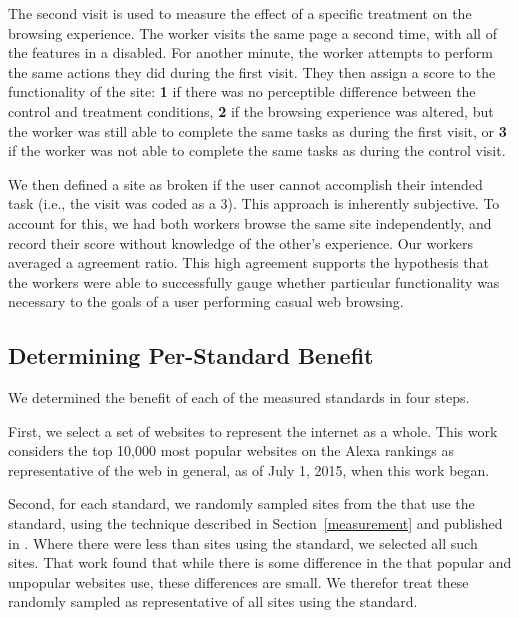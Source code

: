 The second visit is used to measure the effect of a specific treatment on the
browsing experience. The worker visits the same page a second time, with all
of the features in a \WAS disabled. For another minute, the worker attempts
to perform the same actions they did during the first visit. They then assign
a score to the functionality of the site: \textbf{1} if there was no perceptible
difference between the control and treatment conditions, \textbf{2} if the
browsing experience was altered, but the worker was still able to complete the
same tasks as during the first visit, or \textbf{3} if the worker
was not able to complete the same tasks as during the control visit.

We then defined a site as broken if the user cannot accomplish their
intended task (i.e., the visit was coded as a 3). This approach is inherently
subjective. To account for this, we had
both workers browse the same site independently, and record their score without
knowledge of the other's experience. Our workers averaged a \PctAgreementOnStandardTests
agreement ratio. This high agreement supports the hypothesis that the workers
were able to successfully gauge whether particular functionality was necessary
to the goals of a user performing casual web browsing.


\subsection{Determining Per-Standard Benefit}
\label{cost-benefit:methodology:per-standard-benefit}
We determined the benefit of each of the \NumStandards measured standards in four
steps.

First, we select a set of websites to represent the internet as a whole.
This work considers the top 10,000 most popular
websites on the Alexa rankings as representative of the web in general, as
of July 1, 2015, when this work began.

Second, for each standard, we randomly sampled \NumSitesPerStandard sites from
the \ATK that use the standard, using the technique described in Section~\ref{measurement}
and published in \cite{snyder2016browser}.
Where there were less than \NumSitesPerStandard sites using the
standard, we selected all such sites.  That work found that while there
is some difference in the \WASs that popular and unpopular websites use,
these differences are small.  We therefor treat
these randomly sampled \NumSitesPerStandard as representative of all sites using
the standard.

